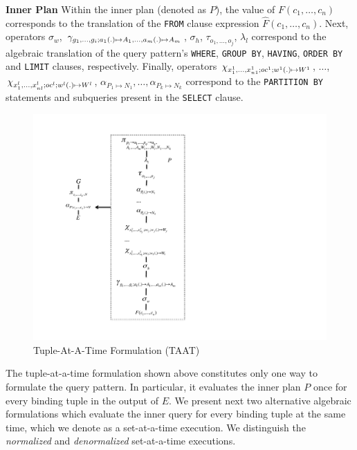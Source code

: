 \textbf{Inner Plan} Within the inner plan (denoted as $P$), the value of $F(c_1, \dots, c_n)$ corresponds to the translation of the \texttt{FROM} clause expression $\hat{F}(c_1, \dots, c_n)$.  Next, operators $\sigma_w$, $\gamma_{g_1,\ldots,g_i; a_1(.) \mapsto A_1, \ldots, a_m(.) \mapsto A_m}$, $\sigma_h$, $\tau_{o_1, \dots, o_j}$, $\lambda_l$ correspond to the algebraic translation of the query pattern's \texttt{WHERE}, \texttt{GROUP BY}, \texttt{HAVING}, \texttt{ORDER BY} and \texttt{LIMIT} clauses, respectively. Finally, operators $\chi_{x_1^1,\dots,x_{n1}^1; oc^1; w^1(.) \mapsto W^1}$, $\dots$, $\chi_{x_1^l,\dots,x_{nl}^l; oc^l; w^l(.) \mapsto W^l}$, $\alpha_{P_1 \mapsto N_1}, \dots, \alpha_{P_k \mapsto N_k}$ correspond to the \texttt{PARTITION BY} statements and subqueries present in the \texttt{SELECT} clause.


\begin{figure}[h]
\centering
\caption{Tuple-At-A-Time Formulation (TAAT) \label{fig:R0}}
\includegraphics[width=0.85 \linewidth]{images/R0.pdf}
\end{figure}

The tuple-at-a-time formulation shown above constitutes only one way to formulate the query pattern. In particular, it evaluates the inner plan $P$ once for every binding tuple in the output of $E$. We present next two alternative algebraic formulations which evaluate the inner query for every binding tuple at the same time, which we denote as a set-at-a-time execution. We distinguish the \emph{normalized} and \emph{denormalized} set-at-a-time executions.

